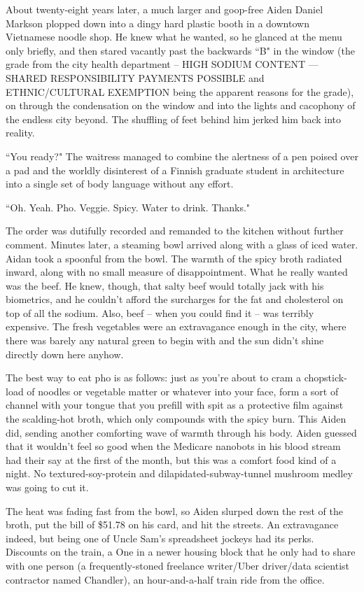\documentclass[11pt]{book}
\begin{document}
	About twenty-eight years later, a much larger and goop-free Aiden Daniel Markson plopped down into a dingy hard plastic booth in a downtown Vietnamese noodle shop. He knew what he wanted, so he glanced at the menu only briefly, and then stared vacantly past the backwards  ``B" in the window (the grade from the city health department -- HIGH SODIUM CONTENT --- SHARED RESPONSIBILITY PAYMENTS POSSIBLE and ETHNIC/CULTURAL EXEMPTION being the apparent reasons for the grade), on through the condensation on the window and into the lights and cacophony of the endless city beyond. The shuffling of feet behind him jerked him back into reality.
	
	``You ready?" The waitress managed to combine the alertness of a pen poised over a pad and the worldly disinterest of a Finnish graduate student in architecture into a single set of body language without any effort.
	
	``Oh. Yeah. Pho. Veggie. Spicy. Water to drink. Thanks."
	
	The order was dutifully recorded and remanded to the kitchen without further comment. Minutes later, a steaming bowl arrived along with a glass of iced water. Aidan took a spoonful from the bowl. The warmth of the spicy broth radiated inward, along with no small measure of disappointment. What he really wanted was the beef. He knew, though, that salty beef would totally jack with his biometrics, and he couldn't afford the surcharges for the fat and cholesterol on top of all the sodium. Also, beef -- when you could find it -- was terribly expensive. The fresh vegetables were an extravagance enough in the city, where there was barely any natural green to begin with and the sun didn't shine directly down here anyhow. 
	
	The best way to eat pho is as follows: just as you're about to cram a chopstick-load of noodles or vegetable matter or whatever into your face, form a sort of channel with your tongue that you prefill with spit as a protective film against the scalding-hot broth, which only compounds with the spicy burn. This Aiden did, sending another comforting wave of warmth through his body. Aiden guessed that it wouldn't feel so good when the Medicare nanobots in his blood stream had their say at the first of the month, but this was a comfort food kind of a night. No textured-soy-protein and dilapidated-subway-tunnel mushroom medley was going to cut it.
	
	The heat was fading fast from the bowl, so Aiden slurped down the rest of the broth, put the bill of \$51.78 on his card, and hit the streets. An extravagance indeed, but being one of Uncle Sam's spreadsheet jockeys had its perks. Discounts on the train, a One in a newer housing block that he only had to share with one person (a frequently-stoned freelance writer/Uber driver/data scientist contractor named Chandler), an hour-and-a-half train ride from the office.
	
\end{document}
